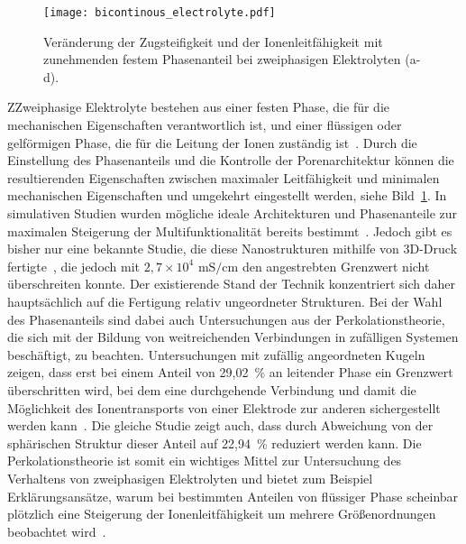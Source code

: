 \begin{figure}[h]
        \center
	\texttt{[image: bicontinous\_electrolyte.pdf]}
		\caption{\label{fig:bicontinous_electrolyte}Veränderung der Zugsteifigkeit und der Ionenleitfähigkeit mit zunehmenden festem Phasenanteil bei zweiphasigen Elektrolyten (a-d).}
\end{figure}
ZZweiphasige Elektrolyte bestehen aus einer festen Phase, die für die mechanischen Eigenschaften verantwortlich ist, und einer flüssigen oder gelförmigen Phase, die für die Leitung der Ionen zuständig ist~\cite{Ichino1995}. Durch die Einstellung des Phasenanteils und die Kontrolle der Porenarchitektur können die resultierenden Eigenschaften zwischen maximaler Leitfähigkeit und minimalen mechanischen Eigenschaften und umgekehrt eingestellt werden, siehe Bild~\ref{fig:bicontinous_electrolyte}. In simulativen Studien wurden mögliche ideale Architekturen und Phasenanteile zur maximalen Steigerung der Multifunktionalität bereits bestimmt~\cite{Lee2019,Tu2020}. Jedoch gibt es bisher nur eine bekannte Studie, die diese Nanostrukturen mithilfe von 3D-Druck fertigte~\cite{Zekoll2018}, die jedoch mit $2,7 \times 10^4$ $\si{\milli \siemens \per \cm}$ den angestrebten Grenzwert nicht überschreiten konnte. Der existierende Stand der Technik konzentriert sich daher hauptsächlich auf die Fertigung relativ ungeordneter Strukturen. Bei der Wahl des Phasenanteils sind dabei auch Untersuchungen aus der Perkolationstheorie, die sich mit der Bildung von weitreichenden Verbindungen in zufälligen Systemen beschäftigt, zu beachten. Untersuchungen mit zufällig angeordneten Kugeln zeigen, dass erst bei einem Anteil von 29,02~\% an leitender Phase ein Grenzwert überschritten wird, bei dem eine durchgehende Verbindung und damit die Möglichkeit des Ionentransports von einer Elektrode zur anderen sichergestellt werden kann~\cite{Li2020b}. Die gleiche Studie zeigt auch, dass durch Abweichung von der sphärischen Struktur dieser Anteil auf 22,94~\% reduziert werden kann. Die Perkolationstheorie ist somit ein wichtiges Mittel zur Untersuchung des Verhaltens von zweiphasigen Elektrolyten und bietet zum Beispiel Erklärungsansätze, warum bei bestimmten Anteilen von flüssiger Phase scheinbar plötzlich eine Steigerung der Ionenleitfähigkeit um mehrere Größenordnungen beobachtet wird~\cite{Melodia2023}.

